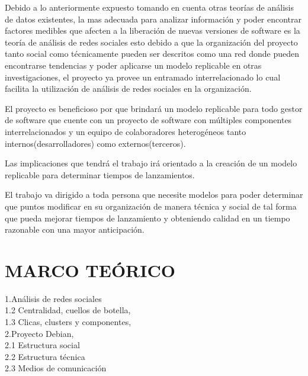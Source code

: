 \documentclass[12pt]{report}
\begin{document}
Debido a lo anteriormente expuesto  tomando en cuenta otras teorías de
análisis  de   datos  existentes,   la  mas  adecuada   para  analizar
información  y poder  encontrar  factores medibles  que  afecten a  la
liberación de nuevas versiones de software es la teoría de análisis de
redes sociales  esto debido a  que la organización del  proyecto tanto
social  como técnicamente  pueden  ser descritos  como  una red  donde
pueden encontrarse  tendencias y poder aplicarse  un modelo replicable
en  otras   investigaciones,  el  proyecto  ya   provee  un  entramado
interrelacionado lo cual facilita la  utilización de análisis de redes
sociales en la organización.

El proyecto es beneficioso por  que brindará un modelo replicable para
todo gestor  de software que  cuente con  un proyecto de  software con
múltiples componentes  interrelacionados y un equipo  de colaboradores
heterogéneos tanto internos(desarrolladores) como externos(terceros).

Las implicaciones que tendrá el trabajo irá orientado a la creación de
un modelo replicable para determinar tiempos de lanzamientos.

El trabajo va dirigido a toda  persona que necesite modelos para poder
determinar que puntos modificar en su organización de manera técnica y
social  de  tal forma  que  pueda  mejorar  tiempos de  lanzamiento  y
obteniendo calidad en un tiempo razonable con una mayor anticipación.

\chapter*{MARCO TEÓRICO}

1.Análisis de redes  sociales \\ 
1.2 Centralidad,  cuellos de botella,\\ 
1.3  Clicas, clusters y  componentes, \\ 
2.Proyecto Debian,  \\ 
2.1 Estructura  social  \\  
2.2  Estructura   técnica  \\  
2.3  Medios  de comunicación \\

\end{document}
